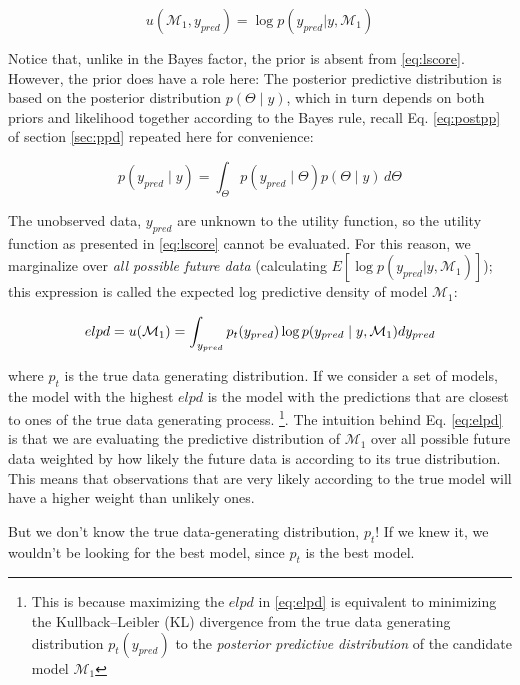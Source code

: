 \documentclass[12pt,]{krantz}
\theoremstyle{definition}
\theoremstyle{definition}
\theoremstyle{definition}
\theoremstyle{remark}
\begin{document}
\begin{equation}
u( \mathcal{M}_1, y_{pred}) = \log p(y_{pred}| y, \mathcal{M}_1)
\label{eq:lscore}
\end{equation}

Notice that, unlike in the Bayes factor, the prior is absent from \eqref{eq:lscore}. However, the prior does have a role here: The posterior predictive distribution is based on the posterior distribution \(p(\Theta\mid y)\), which in turn depends on both priors and likelihood together according to the Bayes rule, recall Eq. \eqref{eq:postpp} of section \ref{sec:ppd} repeated here for convenience:

\begin{equation}
p(y_{pred}\mid y )=\int_\Theta p(y_{pred}\mid \Theta) p(\Theta\mid y)\, d\Theta
\label{eq:postpp}
\end{equation}

The unobserved data, \(y_{pred}\) are unknown to the utility function, so the utility function as presented in \eqref{eq:lscore} cannot be evaluated. For this reason, we marginalize over \emph{all possible future data} (calculating \(E[\log p(y_{pred}| y, \mathcal{M}_1)]\)); this expression is called the expected log predictive density of model \(\mathcal{M}_1\):

\begin{equation}
elpd = u(\mathcal{M}_1) = \int_{y_{pred}} p_t(y_{pred}) \log p(y_{pred} \mid y, \mathcal{M}_1) dy_{pred}\\
\label{eq:elpd}
\end{equation}

where \(p_t\) is the true data generating distribution. If we consider a set of models, the model with the highest \(elpd\) is the model with the predictions that are closest to ones of the true data generating process. \footnote{This is because maximizing the \(elpd\) in \eqref{eq:elpd} is equivalent to minimizing the Kullback--Leibler (KL) divergence from the true data generating distribution \(p_t(y_{pred})\) to the \emph{posterior predictive distribution} of the candidate model \(\mathcal{M}_1\)}. The intuition behind Eq. \eqref{eq:elpd} is that we are evaluating the predictive distribution of \(\mathcal{M}_1\) over all possible future data weighted by how likely the future data is according to its true distribution. This means that observations that are very likely according to the true model will have a higher weight than unlikely ones.

But we don't know the true data-generating distribution, \(p_t\)! If we knew it, we wouldn't be looking for the best model, since \(p_t\) is the best model.
\end{document}
